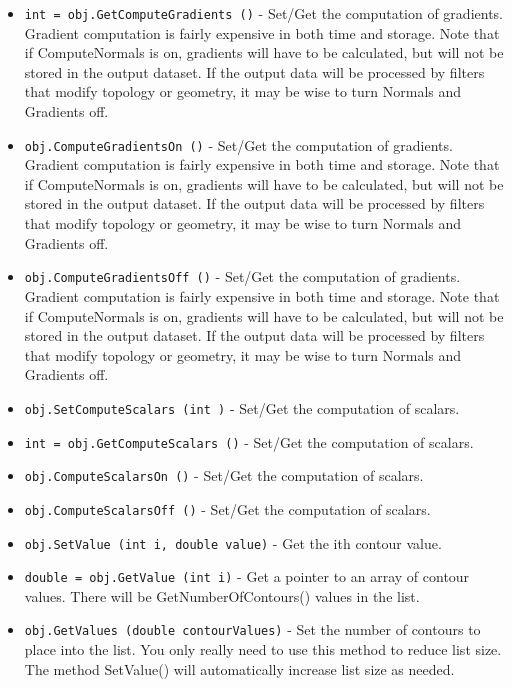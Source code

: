 \begin{itemize}
\item  \verb|int = obj.GetComputeGradients ()| -  Set/Get the computation of gradients. Gradient computation is
 fairly expensive in both time and storage. Note that if
 ComputeNormals is on, gradients will have to be calculated, but
 will not be stored in the output dataset.  If the output data
 will be processed by filters that modify topology or geometry, it
 may be wise to turn Normals and Gradients off.

\item  \verb|obj.ComputeGradientsOn ()| -  Set/Get the computation of gradients. Gradient computation is
 fairly expensive in both time and storage. Note that if
 ComputeNormals is on, gradients will have to be calculated, but
 will not be stored in the output dataset.  If the output data
 will be processed by filters that modify topology or geometry, it
 may be wise to turn Normals and Gradients off.

\item  \verb|obj.ComputeGradientsOff ()| -  Set/Get the computation of gradients. Gradient computation is
 fairly expensive in both time and storage. Note that if
 ComputeNormals is on, gradients will have to be calculated, but
 will not be stored in the output dataset.  If the output data
 will be processed by filters that modify topology or geometry, it
 may be wise to turn Normals and Gradients off.

\item  \verb|obj.SetComputeScalars (int )| -  Set/Get the computation of scalars.

\item  \verb|int = obj.GetComputeScalars ()| -  Set/Get the computation of scalars.

\item  \verb|obj.ComputeScalarsOn ()| -  Set/Get the computation of scalars.

\item  \verb|obj.ComputeScalarsOff ()| -  Set/Get the computation of scalars.

\item  \verb|obj.SetValue (int i, double value)| -  Get the ith contour value.

\item  \verb|double = obj.GetValue (int i)| -  Get a pointer to an array of contour values. There will be
 GetNumberOfContours() values in the list.

\item  \verb|obj.GetValues (double contourValues)| -  Set the number of contours to place into the list. You only really
 need to use this method to reduce list size. The method SetValue()
 will automatically increase list size as needed.


\end{itemize}
